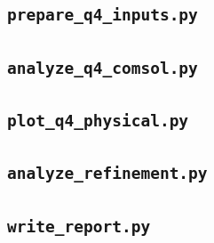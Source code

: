 
\label{app:source17end}

\subsection{\texorpdfstring{\texttt{prepare\_q4\_inputs.py}}{prepare\_q4\_inputs.py}}
\label{app:source18}


\label{app:source18end}

\subsection{\texorpdfstring{\texttt{analyze\_q4\_comsol.py}}{analyze\_q4\_comsol.py}}
\label{app:source19}


\label{app:source19end}

\subsection{\texorpdfstring{\texttt{plot\_q4\_physical.py}}{plot\_q4\_physical.py}}
\label{app:source20}


\label{app:source20end}

\subsection{\texorpdfstring{\texttt{analyze\_refinement.py}}{analyze\_refinement.py}}
\label{app:source21}


\label{app:source21end}

\subsection{\texorpdfstring{\texttt{write\_report.py}}{write\_report.py}}
\label{app:source22}


\label{app:source22end}

\endgroup
